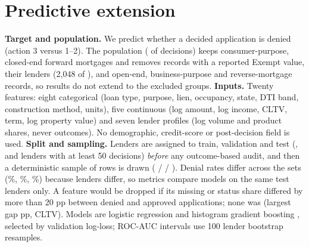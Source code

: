 \documentclass[acmtog,nonacm]{acmart}
\begin{document}
\section{Predictive extension}
\textbf{Target and population.} We predict whether a decided application is denied (action 3 versus 1--2). The population (\PredPop{} of \NDecided{} decisions) keeps consumer-purpose, closed-end forward mortgages and removes records with a reported Exempt value, their lenders (2,048 of \LendersTotal{}), and open-end, business-purpose and reverse-mortgage records, so results do not extend to the excluded groups.
\textbf{Inputs.} Twenty features: eight categorical (loan type, purpose, lien, occupancy, state, DTI band, construction method, units), five continuous (log amount, log income, CLTV, term, log property value) and seven lender profiles (log volume and product shares, never outcomes). No demographic, credit-score or post-decision field is used.
\textbf{Split and sampling.} Lenders are assigned to train, validation and test (\Lendtrain{}, \Lendval{} and \Lendtest{} lenders with at least 50 decisions) \emph{before} any outcome-based audit, and then a deterministic sample of \PredRows{} rows is drawn (\Rowstrain{} / \Rowsval{} / \Rowstest{}). Denial rates differ across the sets (\Dentrain\%, \Denval\%, \Dentest\%) because lenders differ, so metrics compare models on the same test lenders only. A feature would be dropped if its missing or status share differed by more than 20 pp between denied and approved applications; none was (largest gap \MaxGap{} pp, CLTV). Models are logistic regression and histogram gradient boosting \cite{friedman2001,pedregosa2011}, selected by validation log-loss; ROC-AUC intervals use 100 lender bootstrap resamples.
\end{document}
